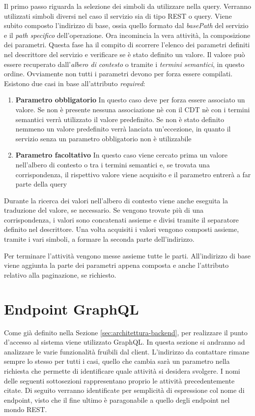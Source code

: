 Il primo passo riguarda la selezione dei simboli da utilizzare nella query. Verranno utilizzati simboli diversi nel caso il servizio sia di tipo REST o query. Viene subito composto l'indirizzo di base, ossia quello formato dal \emph{basePath} del servizio e il \emph{path specifico} dell'operazione. Ora incomincia la vera attività, la composizione dei parametri. Questa fase ha il compito di scorrere l'elenco dei parametri definiti nel descrittore del servizio e verificare se è stato definito un valore. Il valore può essere recuperato dall'\emph{albero di contesto} o tramite i \emph{termini semantici}, in questo ordine. Ovviamente non tutti i parametri devono per forza essere compilati. Esistono due casi in base all'attributo \emph{required}:

\begin{enumerate}
	\item \textbf{Parametro obbligatorio} In questo caso deve per forza essere associato un valore. Se non è presente nessuna associazione nè con il CDT nè con i termini semantici verrà utilizzato il valore predefinito. Se non è stato definito nemmeno un valore predefinito verrà lanciata un'eccezione, in quanto il servizio senza un parametro obbligatorio non è utilizzabile
	\item \textbf{Parametro facoltativo} In questo caso viene cercato prima un valore nell'albero di contesto o tra i termini semantici e, se trovata una corrispondenza, il rispettivo valore viene acquisito e il parametro entrerà a far parte della query
\end{enumerate}

Durante la ricerca dei valori nell'albero di contesto viene anche eseguita la traduzione del valore, se necessario. Se vengono trovate più di una corrispondenza, i valori sono concatenati assieme e divisi tramite il separatore definito nel descrittore. Una volta acquisiti i valori vengono composti assieme, tramite i vari simboli, a formare la seconda parte dell'indirizzo.

Per terminare l'attività vengono messe assieme tutte le parti. All'indirizzo di base viene aggiunta la parte dei parametri appena composta e anche l'attributo relativo alla paginazione, se richiesto.

\section{Endpoint GraphQL\label{sec:endpoint-graphql}}

Come già definito nella Sezione \ref{sec:architettura-backend}, per realizzare il punto d'accesso al sistema viene utilizzato GraphQL. In questa sezione si andranno ad analizzare le varie funzionalità fruibili dal client. L'indirizzo da contattare rimane sempre lo stesso per tutti i casi, quello che cambia sarà un parametro nella richiesta che permette di identificare quale attività si desidera svolgere. I nomi delle seguenti sottosezioni rappresentano proprio le attività precedentemente citate. Di seguito verranno identificate per semplicità di espressione col nome di endpoint, visto che il fine ultimo è paragonabile a quello degli endpoint nel mondo REST.

